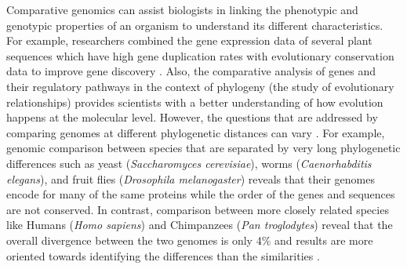 Comparative genomics can assist biologists in linking the phenotypic and genotypic properties of an organism to understand its different characteristics. For example, researchers combined the gene expression data of several plant sequences which have high gene duplication rates with evolutionary conservation data to improve gene discovery \cite{hanada2008importance}. Also, the comparative analysis of genes and their regulatory pathways in the context of phylogeny (the study of evolutionary relationships) provides scientists with a better understanding of how evolution happens at the molecular level\cite{soltis2003role}. However, the questions that are addressed by comparing genomes at different phylogenetic distances can vary \cite{hardison2003comparative}. For example, genomic comparison between species that are separated by very long phylogenetic differences such as yeast (\textit{Saccharomyces cerevisiae}), worms (\textit{Caenorhabditis
elegans}), and fruit flies (\textit{Drosophila melanogaster}) reveals that their genomes encode for many of the same proteins while the order of the genes and sequences are not conserved\cite{rubin2000comparative}. In contrast, comparison between more closely related species like Humans (\textit{Homo sapiens}) and Chimpanzees (\textit{Pan troglodytes}) reveal that the overall divergence between the two genomes is only 4\% and results are more oriented towards identifying the differences than the similarities \cite{varki2005comparing}. 

